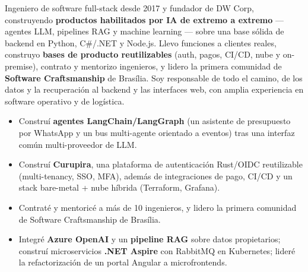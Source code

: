 \documentclass[10pt,a4paper]{altacv}
\begin{document}

\makecvheader


Ingeniero de software full-stack desde 2017 y fundador de DW Corp, construyendo \textbf{productos habilitados por IA de extremo a extremo} — agentes LLM, pipelines RAG y machine learning — sobre una base sólida de backend en Python, C\#/.NET y Node.js. Llevo funciones a clientes reales, construyo \textbf{bases de producto reutilizables} (auth, pagos, CI/CD, nube y on-premise), contrato y mentorizo ingenieros, y lidero la primera comunidad de \textbf{Software Craftsmanship} de Brasília. Soy responsable de todo el camino, de los datos y la recuperación al backend y las interfaces web, con amplia experiencia en software operativo y de logística.


\begin{itemize}
\item Construí \textbf{agentes LangChain/LangGraph} (un asistente de presupuesto por WhatsApp y un bus multi-agente orientado a eventos) tras una interfaz común multi-proveedor de LLM.
\item Construí \textbf{Curupira}, una plataforma de autenticación Rust/OIDC reutilizable (multi-tenancy, SSO, MFA), además de integraciones de pago, CI/CD y un stack bare-metal + nube híbrida (Terraform, Grafana).
\item Contraté y mentoricé a más de 10 ingenieros, y lidero la primera comunidad de Software Craftsmanship de Brasília.
\end{itemize}
\divider

\begin{itemize}
\item Integré \textbf{Azure OpenAI} y un \textbf{pipeline RAG} sobre datos propietarios; construí microservicios \textbf{.NET Aspire} con RabbitMQ en Kubernetes; lideré la refactorización de un portal Angular a microfrontends.
\end{itemize}
\divider
\end{document}
